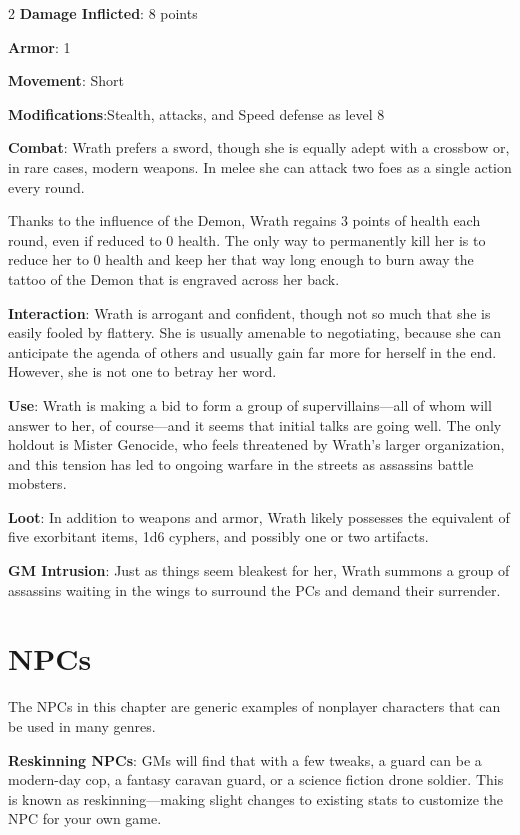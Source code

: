 \begin{multicols}{2}
\textbf{Damage Inflicted}: 8 points

\textbf{Armor}: 1

\textbf{Movement}: Short

\textbf{Modifications}:Stealth, attacks, and Speed defense as level 8

\textbf{Combat}: Wrath prefers a sword, though she is equally adept with a crossbow or, in rare cases, modern weapons. In melee she can attack two foes as a single action every round.

Thanks to the influence of the Demon, Wrath regains 3 points of health each round, even if reduced to 0 health. The only way to permanently kill her is to reduce her to 0 health and keep her that way long enough to burn away the tattoo of the Demon that is engraved across her back.

\textbf{Interaction}: Wrath is arrogant and confident, though not so much that she is easily fooled by flattery. She is usually amenable to negotiating, because she can anticipate the agenda of others and usually gain far more for herself in the end. However, she is not one to betray her word.

\textbf{Use}: Wrath is making a bid to form a group of supervillains—all of whom will answer to her, of course—and it seems that initial talks are going well. The only holdout is Mister Genocide, who feels threatened by Wrath’s larger organization, and this tension has led to ongoing warfare in the streets as assassins battle mobsters.

\textbf{Loot}: In addition to weapons and armor, Wrath likely possesses the equivalent of five exorbitant items, 1d6 cyphers, and possibly one or two artifacts.

\textbf{GM Intrusion}: Just as things seem bleakest for her, Wrath summons a group of assassins waiting in the wings to surround the PCs and demand their surrender.

\section{NPCs}

The NPCs in this chapter are generic examples of nonplayer characters that can be used in many genres.

\textbf{Reskinning NPCs}: GMs will find that with a few tweaks, a guard can be a modern-day cop, a fantasy caravan guard, or a science fiction drone soldier. This is known as reskinning—making slight changes to existing stats to customize the NPC for your own game.


\end{multicols}

